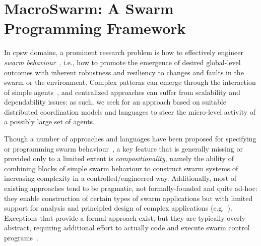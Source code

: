 %
\newcommand{\MacroSwarm}{{\sc{}MacroSwarm}}

\chapter[\MacroSwarm{}]{\MacroSwarm{}: A Swarm Programming Framework}\label{chap:eng:macroswarm}
\minitoc%
%
In \ac{cpsw} domains,
 a prominent research problem
 is how to effectively engineer \emph{swarm behaviour}~\cite{DBLP:journals/swarm/BrambillaFBD13},
 i.e., how to promote 
 the emergence of desired global-level outcomes %
 with inherent robustness and resiliency to changes and faults in the swarm or the environment.
%
Complex patterns can emerge through the interaction of simple agents~\cite{bonabeau1999swarmintelligence-book}, and centralized approaches %
 can suffer from scalability and dependability issues: as such,  
 we seek for an approach based on %
 suitable distributed coordination models and languages to steer the micro-level activity of a possibly large set of agents.
%
 
%
Though a number of approaches and languages have been proposed 
 for specifying or programming swarm behaviour~\cite{Meld2007,%
DBLP:conf/icra/CarrollNS21,%
paros,%
DBLP:conf/isola/KosakHBWHR20,%
Koutsoubelias2016tecola,%
lima2018dolphin,%
Mottola2014voltron,%
DBLP:conf/iros/PinciroliB16,%
DBLP:conf/iros/YiDLD0WY20},
 a key feature that is generally missing or provided only to a limited extent
 is \emph{compositionality},
 namely the ability of combining blocks of simple swarm behaviour to construct swarm systems of increasing complexity in a controlled/engineered way.
%
Additionally, most of existing approaches tend to be pragmatic, not formally-founded and quite ad-hoc: they 
 enable construction of certain types of swarm applications
 but with limited support for analysis and principled design of complex applications (e.g.~\cite{lima2018dolphin,paros,DBLP:conf/iros/PinciroliB16,DBLP:conf/icra/CarrollNS21}).
%
Exceptions that provide a formal approach exist, but they are typically overly abstract, requiring additional effort to actually code and execute swarm control programs~\cite{DBLP:journals/csur/LuckcuckFDDF19}.

